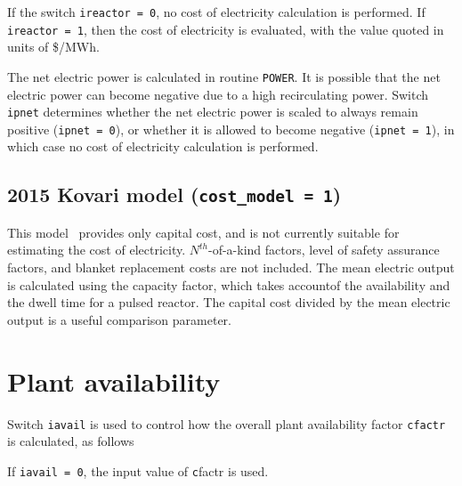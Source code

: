 \documentclass[11pt,a4paper]{report}
\begin{document}
If the switch \texttt{ireactor = 0}, no cost of electricity calculation is performed. If \texttt{ireactor = 1}, then the cost of electricity is evaluated, with the value quoted in units of \$/MWh.

The net electric power is calculated in routine \texttt{POWER}. It is possible that the net electric power can become negative due to a high recirculating power. Switch \texttt{ipnet} determines whether the net electric power is scaled to always remain positive (\texttt{ipnet = 0}), or whether it is allowed to become negative (\texttt{ipnet = 1}), in which case no cost of electricity calculation is performed.

\subsection{2015 Kovari model (\texttt{cost\_model = 1})}
This model~\cite{kovari_cost} provides only capital cost, and is not currently suitable for estimating the cost of electricity.  $N^{th}$-of-a-kind factors, level of safety assurance factors, and blanket replacement costs are not included.  The mean electric output is calculated using the capacity factor, which takes accountof the availability and the dwell time for a pulsed reactor.  The capital cost divided by the mean electric output is a useful comparison parameter.

\section{Plant availability}

Switch \texttt{iavail} is used to control how the overall plant availability
factor \texttt{cfactr} is calculated, as follows

If \texttt{iavail = 0}, the input value of \texttt cfactr is used.
\end{document}
